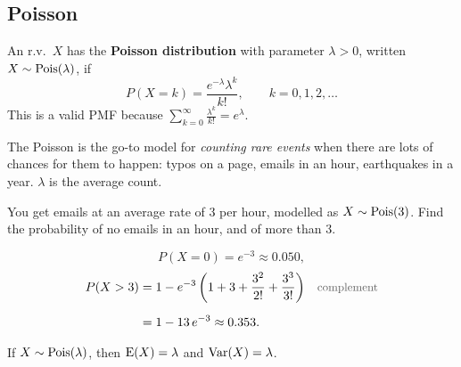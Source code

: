 \bigskip

\subsection{Poisson}

\bigskip

\begin{definition}\label{def:pois}
An r.v.\ $X$ has the \textbf{Poisson distribution} with parameter $\lambda > 0$, written $X \sim \operatorname{Pois}(\lambda)$, if
\medskip
\[
P(X = k) = \frac{e^{-\lambda}\lambda^{k}}{k!}, \qquad k = 0, 1, 2, \dots
\]
\medskip
This is a valid PMF because $\sum_{k=0}^{\infty} \frac{\lambda^{k}}{k!} = e^{\lambda}$.
\end{definition}

\bigskip

\begin{intuition}
The Poisson is the go-to model for \emph{counting rare events} when there are lots of chances for them to happen: typos on a page, emails in an hour, earthquakes in a year. $\lambda$ is the average count.
\end{intuition}

\bigskip

\begin{example}
You get emails at an average rate of $3$ per hour, modelled as $X \sim \operatorname{Pois}(3)$. Find the probability of no emails in an hour, and of more than $3$.
\end{example}

\medskip

\begin{solution}
\medskip
\[
P(X = 0) = e^{-3} \approx 0.050,
\]
\medskip
\begin{align*}
P(X > 3)
  &= 1 - e^{-3}\left(1 + 3 + \frac{3^{2}}{2!} + \frac{3^{3}}{3!}\right)
  && \by{complement} \\[0.6em]
  &= 1 - 13\,e^{-3}
   \approx 0.353.
\end{align*}
\end{solution}

\bigskip

\begin{theorem}\label{thm:poisEV}
If $X \sim \operatorname{Pois}(\lambda)$, then $\operatorname{E}(X) = \lambda$ and $\operatorname{Var}(X) = \lambda$.
\end{theorem}

